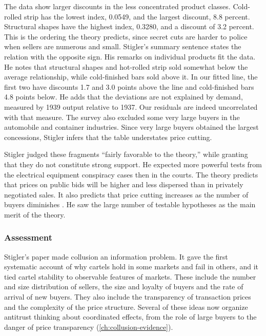 The data show larger discounts in the less concentrated product classes. Cold-rolled strip has the lowest index,
0.0549, and the largest discount, 8.8 percent. Structural shapes have the highest index, 0.3280, and a discount of
3.2 percent. This is the ordering the theory predicts, since secret cuts are harder to police when sellers are
numerous and small. Stigler's summary sentence states the relation with the opposite sign. His remarks on
individual products fit the data. He notes that structural shapes and hot-rolled strip sold somewhat below the
average relationship, while cold-finished bars sold above it. In our fitted line, the first two have discounts 1.7
and 3.0 points above the line and cold-finished bars 4.8 points below. He adds that the deviations are not
explained by demand, measured by 1939 output relative to 1937. Our residuals are indeed uncorrelated with that
measure. The survey also excluded some very large buyers in the automobile and container industries. Since very
large buyers obtained the largest concessions, Stigler infers that the table understates price cutting.

Stigler judged these fragments ``fairly favorable to the theory,'' while granting that they do not constitute strong
support. He expected more powerful tests from the electrical equipment conspiracy cases then in the courts. The
theory predicts that prices on public bids will be higher and less dispersed than in privately negotiated sales.
It also predicts that price cutting increases as the number of buyers diminishes \citep[footnote 16]{Stigler1964}. He saw the
large number of testable hypotheses as the main merit of the theory.

\subsubsection{Assessment}

Stigler's paper made collusion an information problem. It gave the first systematic account of why cartels hold in
some markets and fail in others, and it tied cartel stability to observable features of markets. These include the
number and size distribution of sellers, the size and loyalty of buyers and the rate of arrival of new buyers.
They also include the transparency of transaction prices and the complexity of the price structure. Several of these ideas now organize
antitrust thinking about coordinated effects, from the role of large buyers to the danger of price transparency
(\cref{ch:collusion-evidence}).

